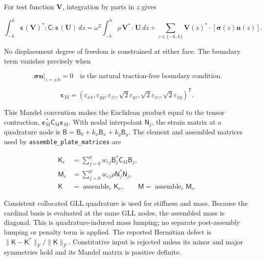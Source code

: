 For test function \(\boldsymbol V\), integration by parts in \(z\) gives

\begin{equation}
 \int_{-h}^{h}\!\boldsymbol\varepsilon(\boldsymbol V)^*
 :\mathsf C:\boldsymbol\varepsilon(\boldsymbol U)\,dz
 =\omega^2\int_{-h}^{h}\!\rho\,\boldsymbol V^*\!\cdot
 \boldsymbol U\,dz
 +\sum_{z\in\{-h,h\}}
 \boldsymbol V(z)^*\!\cdot[\boldsymbol\sigma(z)\boldsymbol n(z)] .
 \label{eq:spectral-weak-form}
\end{equation}

No displacement degree of freedom is constrained at either face.  The
boundary term vanishes precisely when

\begin{equation}
 \bigl.\boldsymbol\sigma\boldsymbol n\bigr|_{z=\pm h}=0
 \quad\text{is the natural traction-free boundary condition.}
 \label{eq:natural-traction-boundary}
\end{equation}

\begin{equation}
 \boldsymbol\varepsilon_{\mathrm M}
 =(\varepsilon_{xx},\varepsilon_{yy},\varepsilon_{zz},
 \sqrt2\varepsilon_{yz},\sqrt2\varepsilon_{xz},
 \sqrt2\varepsilon_{xy})^{\mathsf T}.
 \label{eq:mandel-convention}
\end{equation}

This Mandel convention makes the Euclidean product equal to the tensor
contraction, \(\boldsymbol\varepsilon_{\mathrm M}^*
\mathsf C_{\mathrm M}\boldsymbol\varepsilon_{\mathrm M}\).  With nodal
interpolant \(\mathsf N_j\), the strain matrix at a quadrature node is
\(\mathsf B=\mathsf B_0+k_x\mathsf B_x+k_y\mathsf B_y\).  The element
and assembled matrices used by \texttt{assemble\_plate\_matrices} are

\[
 \begin{aligned}
 \mathsf K_e&=\sum_{j=0}^{p}w_{ej}\mathsf B_j^*
 \mathsf C_{\mathrm M}\mathsf B_j,\\
 \mathsf M_e&=\sum_{j=0}^{p}w_{ej}\rho\mathsf N_j^*\mathsf N_j,\\
 \mathsf K&=\mathop{\mathrm{assemble}}_e\mathsf K_e,\qquad
 \mathsf M=\mathop{\mathrm{assemble}}_e\mathsf M_e .
 \end{aligned}
\]

Consistent collocated GLL quadrature is used for stiffness and mass.  Because
the cardinal basis is evaluated at the same GLL nodes, the assembled mass is
diagonal.  This is quadrature-induced mass lumping; no separate
post-assembly lumping or penalty term is applied.  The reported Hermitian defect is
\(\|\mathsf K-\mathsf K^*\|_F/\|\mathsf K\|_F\).  Constitutive input is
rejected unless its minor and major symmetries hold and its Mandel matrix is
positive definite.

